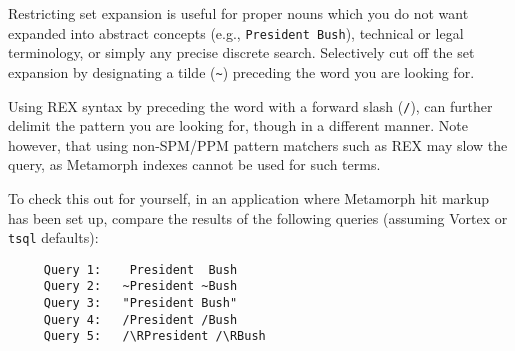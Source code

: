 Restricting set expansion is useful for proper nouns which you do not
want expanded into abstract concepts (e.g., \verb`President Bush`),
technical or legal terminology, or simply any precise discrete search.
Selectively cut off the set expansion by designating a tilde
(\verb`~`) preceding the word you are looking for.

Using REX syntax by preceding the word with a forward slash
(\verb`/`), can further delimit the pattern you are looking for,
though in a different manner.  Note however, that using non-SPM/PPM
pattern matchers such as REX may slow the query, as Metamorph indexes
cannot be used for such terms.

To check this out for yourself, in an application where Metamorph hit
markup has been set up, compare the results of the following queries
(assuming Vortex or \verb`tsql` defaults):

\begin{verbatim}
     Query 1:    President  Bush
     Query 2:   ~President ~Bush
     Query 3:   "President Bush"
     Query 4:   /President /Bush
     Query 5:   /\RPresident /\RBush
\end{verbatim}


